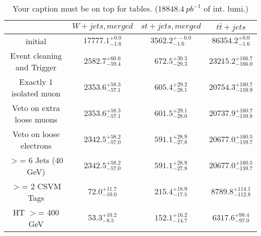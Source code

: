 \documentclass{article}
\begin{document}
\begin{table}
\caption{Your caption must be on top for tables. ($18848.4~pb^{-1}$ of int. lumi.)}
\label{tab:}
\centering
\begin{tabular}{|c|ccc|}
\toprule
&$W+jets, merged$	&$st+jets, merged$	&$t\bar{t}+jets$	\\

\midrule
initial&	$17777.1^{+0.0}_{-1.6}$	&$3562.2^{+-0.0}_{-1.6}$	&$86354.2^{+0.0}_{-1.6}$	\\

Event cleaning and Trigger&	$2582.7^{+60.6}_{-59.4}$	&$672.5^{+30.3}_{-29.3}$	&$23215.2^{+166.7}_{-166.0}$	\\

Exactly 1 isolated muon&	$2353.6^{+58.3}_{-57.1}$	&$605.4^{+29.2}_{-28.1}$	&$20754.3^{+160.7}_{-159.9}$	\\

Veto on extra loose muons&	$2353.6^{+58.3}_{-57.1}$	&$601.5^{+29.1}_{-28.0}$	&$20737.9^{+160.7}_{-159.8}$	\\

Veto on loose electrons&	$2342.5^{+58.2}_{-57.0}$	&$591.1^{+28.9}_{-27.8}$	&$20677.0^{+160.5}_{-159.7}$	\\

$>$= 6 Jets (40 GeV)&	$2342.5^{+58.2}_{-57.0}$	&$591.1^{+28.9}_{-27.8}$	&$20677.0^{+160.5}_{-159.7}$	\\

$>$= 2 CSVM Tags&	$72.0^{+11.7}_{-10.0}$	&$215.4^{+18.9}_{-17.5}$	&$8789.8^{+114.1}_{-112.8}$	\\

HT $>$=  400 GeV&	$53.3^{+10.2}_{-8.5}$	&$152.1^{+16.2}_{-14.7}$	&$6317.6^{+98.4}_{-97.0}$	\\

\bottomrule
\end{tabular}
\end{table}
\end{document}
